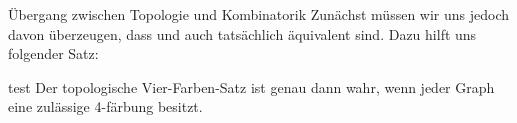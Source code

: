 \begin{chapter}{Übergang zwischen Topologie und Kombinatorik}
 Zunächst müssen wir uns jedoch davon überzeugen, dass  und  auch tatsächlich äquivalent sind. Dazu hilft uns folgender Satz:
 
 \begin{satz}{test}
  Der topologische Vier-Farben-Satz ist genau dann wahr, wenn jeder Graph eine zulässige 4-färbung besitzt.
 \end{satz}
\end{chapter}